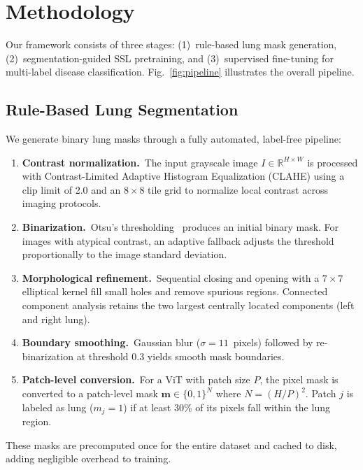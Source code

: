 \section{Methodology}
\label{sec:methodology}

Our framework consists of three stages: (1)~rule-based lung mask generation, (2)~segmentation-guided SSL pretraining, and (3)~supervised fine-tuning for multi-label disease classification. Fig.~\ref{fig:pipeline} illustrates the overall pipeline.

\subsection{Rule-Based Lung Segmentation}
\label{sec:segmentation}

We generate binary lung masks through a fully automated, label-free pipeline:

\begin{enumerate}
    \item \textbf{Contrast normalization.}~The input grayscale image $I \in \mathbb{R}^{H \times W}$ is processed with Contrast-Limited Adaptive Histogram Equalization (CLAHE) using a clip limit of 2.0 and an $8 \times 8$ tile grid to normalize local contrast across imaging protocols.
    \item \textbf{Binarization.}~Otsu's thresholding~\cite{otsu1979threshold} produces an initial binary mask. For images with atypical contrast, an adaptive fallback adjusts the threshold proportionally to the image standard deviation.
    \item \textbf{Morphological refinement.}~Sequential closing and opening with a $7 \times 7$ elliptical kernel fill small holes and remove spurious regions. Connected component analysis retains the two largest centrally located components (left and right lung).
    \item \textbf{Boundary smoothing.}~Gaussian blur ($\sigma = 11$~pixels) followed by re-binarization at threshold 0.3 yields smooth mask boundaries.
    \item \textbf{Patch-level conversion.}~For a ViT with patch size $P$, the pixel mask is converted to a patch-level mask $\bm{m} \in \{0, 1\}^{N}$ where $N = (H/P)^2$. Patch $j$ is labeled as lung ($m_j = 1$) if at least 30\% of its pixels fall within the lung region.
\end{enumerate}

These masks are precomputed once for the entire dataset and cached to disk, adding negligible overhead to training.


